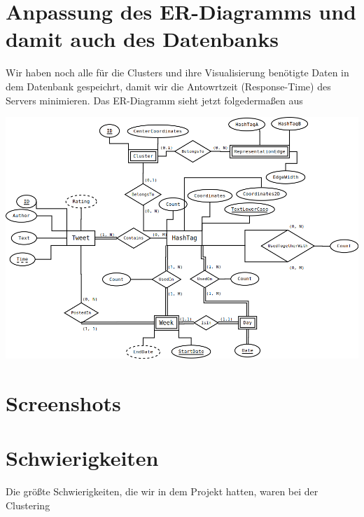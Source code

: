 \section*{Anpassung des ER-Diagramms und damit auch des Datenbanks}

Wir haben noch alle für die Clusters und ihre Visualisierung benötigte Daten in dem Datenbank gespeichrt, damit wir die Antowrtzeit (Response-Time) des Servers minimieren. Das ER-Diagramm sieht jetzt folgedermaßen aus

\includegraphics[width=\textwidth]{../ER-Diagramms/ERDiagramm_v2.png}

\section*{Screenshots}



\section*{Schwierigkeiten}

Die größte Schwierigkeiten, die wir in dem Projekt hatten, waren bei der Clustering

